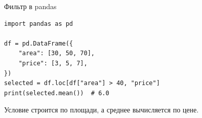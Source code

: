 \begin{frame}[fragile]{Фильтр в pandas}
\begin{verbatim}
import pandas as pd

df = pd.DataFrame({
    "area": [30, 50, 70],
    "price": [3, 5, 7],
})
selected = df.loc[df["area"] > 40, "price"]
print(selected.mean())  # 6.0
\end{verbatim}
  Условие строится по площади, а среднее вычисляется по цене.
\end{frame}
